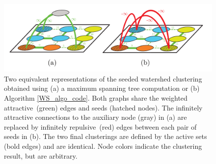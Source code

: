 \begin{figure}[t]
\centering
\includegraphics[width=\linewidth]{figures/MWS/images/seeded-WS.pdf}%
   \caption{Two equivalent representations of the seeded watershed clustering obtained using (a) a maximum spanning tree computation or (b) Algorithm \ref{WS_algo_code}. Both graphs share the weighted attractive~(green) edges and seeds (hatched nodes). The infinitely attractive connections to the auxiliary node (gray) in (a) are replaced by infinitely repulsive~(red) edges between each pair of seeds in (b). The two final clusterings are defined by the active sets (bold edges) and are identical. Node colors indicate the clustering result, but are arbitrary.}
\label{fig:WS_compare}
\end{figure}

